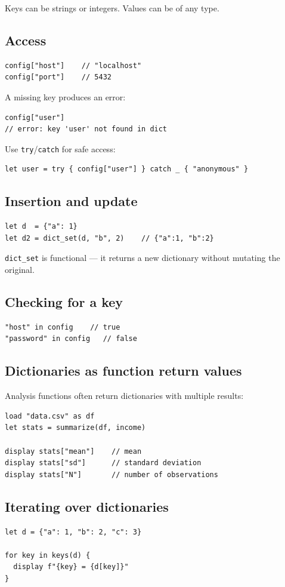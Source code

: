 Keys can be strings or integers. Values can be of any type.

\subsection{Access}

\begin{lstlisting}
config["host"]    // "localhost"
config["port"]    // 5432
\end{lstlisting}

A missing key produces an error:

\begin{lstlisting}
config["user"]
// error: key 'user' not found in dict
\end{lstlisting}

Use \lstinline{try}/\lstinline{catch} for safe access:

\begin{lstlisting}
let user = try { config["user"] } catch _ { "anonymous" }
\end{lstlisting}

\subsection{Insertion and update}

\begin{lstlisting}
let d  = {"a": 1}
let d2 = dict_set(d, "b", 2)    // {"a":1, "b":2}
\end{lstlisting}

\lstinline{dict_set} is functional — it returns a new dictionary without
mutating the original.

\subsection{Checking for a key}

\begin{lstlisting}
"host" in config    // true
"password" in config   // false
\end{lstlisting}

\subsection{Dictionaries as function return values}

Analysis functions often return dictionaries with multiple results:

\begin{lstlisting}[caption={summarize returns a dictionary}]
load "data.csv" as df
let stats = summarize(df, income)

display stats["mean"]    // mean
display stats["sd"]      // standard deviation
display stats["N"]       // number of observations
\end{lstlisting}

\subsection{Iterating over dictionaries}

\begin{lstlisting}
let d = {"a": 1, "b": 2, "c": 3}

for key in keys(d) {
  display f"{key} = {d[key]}"
}
\end{lstlisting}
